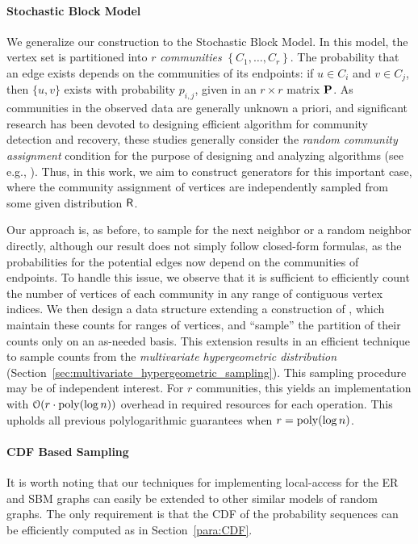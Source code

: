 \paragraph*{Stochastic Block Model}
\label{par:stochastic_block_model}
We generalize our construction to the Stochastic Block Model.
In this model, the vertex set is partitioned into $r$ \emph{communities}
$\left\{ C_1, \ldots, C_r \right\}$.
The probability that an edge exists depends on the communities of its endpoints:
if $u\in C_i$ and $v \in C_j$, then $\{u,v\}$ exists with probability $p_{i,j}$,
given in an $r\times r$ matrix $\mathbf{P}$.
As communities in the observed data are generally unknown a priori,
and significant research has been devoted to designing efficient algorithm
for community detection and recovery,
these studies generally consider the \emph{random community assignment} condition for the purpose of designing and analyzing algorithms (see e.g., \cite{mossel2015reconstruction}).
Thus, in this work, we aim to construct generators for this important case, where the community assignment of vertices are independently sampled from some given distribution $\mathsf{R}$.

Our approach is, as before, to sample for the next neighbor or a random neighbor directly,
although our result does not simply follow closed-form formulas,
as the probabilities for the potential edges now depend
on the communities of endpoints.
To handle this issue, we observe that it is sufficient to efficiently count
the number of vertices of each community in any
range of contiguous vertex indices.
We then design a data structure extending a construction of \cite{huge},
which maintain these counts for ranges of vertices,
and ``sample'' the partition of their counts only on an as-needed basis.
This extension results in an efficient technique to sample counts
from the \emph{multivariate hypergeometric distribution} (Section~\ref{sec:multivariate_hypergeometric_sampling}).
This sampling procedure may be of independent interest.
For $r$ communities, this yields an implementation with
$ \mathcal{O}(r\cdot \mathrm{poly}(\log n))$ overhead in required resources for each operation.
This upholds all previous polylogarithmic guarantees when $r = \mathrm{poly}(\log n)$.

\paragraph*{CDF Based Sampling}
It is worth noting that our techniques for implementing local-access for the ER and SBM graphs
can easily be extended to other similar models of random graphs.
The only requirement is that the CDF of the probability sequences can be efficiently computed as in Section~\ref{para:CDF}.





